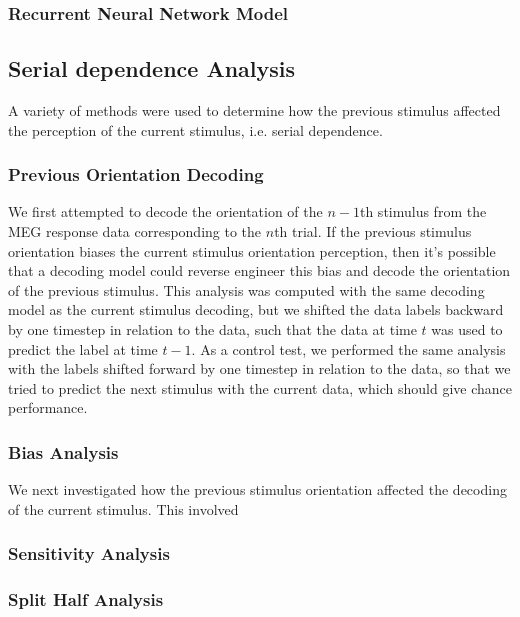 \documentclass[../main.tex]{subfiles}
\begin{document}

\subsubsection{Recurrent Neural Network Model}


\subsection{Serial dependence Analysis}
A variety of methods were used to determine how the previous stimulus affected the perception of the current stimulus, i.e. serial dependence. 

\subsubsection{Previous Orientation Decoding}
We first attempted to decode the orientation of the $n-1$th stimulus from the MEG response data corresponding to the $n$th trial. If the previous stimulus orientation biases the current stimulus orientation perception, then it's possible that a decoding model could reverse engineer this bias and decode the orientation of the previous stimulus. This analysis was computed with the same decoding model as the current stimulus decoding, but we shifted the data labels backward by one timestep in relation to the data, such that the data at time $t$ was used to predict the label at time $t - 1$. As a control test, we performed the same analysis with the labels shifted forward by one timestep in relation to the data, so that we tried to predict the next stimulus with the current data, which should give chance performance.

\subsubsection{Bias Analysis}
We next investigated how the previous stimulus orientation affected the decoding of the current stimulus. This involved

\subsubsection{Sensitivity Analysis}


\subsubsection{Split Half Analysis}
\end{document}

